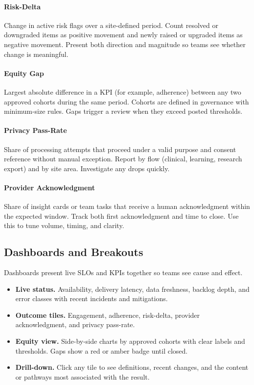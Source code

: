 \documentclass[12pt]{article}
\begin{document}
\paragraph{Risk-Delta}
Change in active risk flags over a site-defined period. Count resolved or downgraded items as positive movement and newly raised or upgraded items as negative movement. Present both direction and magnitude so teams see whether change is meaningful.

\paragraph{Equity Gap}
Largest absolute difference in a KPI (for example, adherence) between any two approved cohorts during the same period. Cohorts are defined in governance with minimum-size rules. Gaps trigger a review when they exceed posted thresholds.

\paragraph{Privacy Pass-Rate}
Share of processing attempts that proceed under a valid purpose and consent reference without manual exception. Report by flow (clinical, learning, research export) and by site area. Investigate any drops quickly.

\paragraph{Provider Acknowledgment}
Share of insight cards or team tasks that receive a human acknowledgment within the expected window. Track both first acknowledgment and time to close. Use this to tune volume, timing, and clarity.

\subsection*{Dashboards and Breakouts}
Dashboards present live SLOs and KPIs together so teams see cause and effect.
\begin{itemize}[leftmargin=*]
  \item \textbf{Live status.} Availability, delivery latency, data freshness, backlog depth, and error classes with recent incidents and mitigations.
  \item \textbf{Outcome tiles.} Engagement, adherence, risk-delta, provider acknowledgment, and privacy pass-rate.
  \item \textbf{Equity view.} Side-by-side charts by approved cohorts with clear labels and thresholds. Gaps show a red or amber badge until closed.
  \item \textbf{Drill-down.} Click any tile to see definitions, recent changes, and the content or pathways most associated with the result.
\end{itemize}
\end{document}
